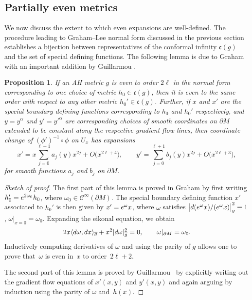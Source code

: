 \documentclass[11pt]{article}
\numberwithin{equation}{section}
\newtheorem{Proposition}[Theorem]{Proposition}
 { \theoremstyle{definition}
\newtheorem{Definition}[Theorem]{Definition}
\newtheorem{Example}[Theorem]{Example}
\newtheorem{Remark}[Theorem]{Remark} }
\newcommand{\del}{\partial}
\newcommand{\olg}{\overline{g}}
\newcommand{\frakc}{\mathfrak c}
\newcommand{\calC}{\mathcal C}
\begin{document}
\subsection{Partially even metrics}

We now discuss the extent to which even expansions are well-defined. The procedure leading to Graham--Lee normal form discussed in the previous section establishes a bijection between representatives of the conformal infinity $\mathfrak c(g)$ and the set of special defining functions. The following lemma is due to Graham \cite{Gr} with an important addition by Guillarmou \cite{Guillarmou}.

\begin{Proposition}\label{proposition1.5}
If an AH metric $g$ is even to order $2\ell$ in the normal form corresponding to one choice of metric $h_0 \in \frakc (g)$,
then it is even to the same order with respect to any other metric $h_0' \in \frakc(g)$. Further, if $x$ and $x'$ are the special boundary defining functions corresponding to $h_0$ and $h_0'$ respectively, and $y = y^{\alpha}$ and $y' = {y'}^{\alpha}$ are corresponding choices of smooth coordinates on $\partial M$ extended to be constant along the respective gradient flow lines, then coordinate change of $(\phi')^{-1}\circ \phi$ on $U_x$ has expansions
\[ x' = x \sum_{j=0}^{\ell+1} a_j(y) x^{2j} + O\big(x^{2\ell+4}\big), \qquad y' = \sum_{j=0}^{\ell+1} b_j(y) x^{2j} + O\big(x^{2\ell+3}\big), \]
for smooth functions $a_j$ and $b_j$ on $\partial M$.
\end{Proposition}
\begin{proof}[Sketch of proof] The first part of this lemma is proved in Graham \cite{Gr} by first writing $h_0' = {\rm e}^{2\omega_0} h_0$, where $\omega_0 \in \calC^\infty(\del M)$. The special boundary defining function $x'$ associated to $h_0'$ is then given by $x' = {\rm e}^{\omega} x$, where $\omega$ satisfies $\big| {\rm d}({\rm e}^\omega x)/ ({\rm e}^\omega x)\big|^2_g \equiv 1$, $\omega|_{x=0} = \omega_0$. Expanding the eikonal equation, we obtain
\begin{gather}\label{eq1.7}
2x \langle {\rm d}\omega, {\rm d}x \rangle_{\olg} + x^2 |{\rm d}\omega|^2_{\olg} = 0, \qquad \omega |_{\del M} = \omega_0.
\end{gather}
Inductively computing derivatives of $\omega$ and using the parity of $g$ allows one to prove that~$\omega$ is even in~$x$ to order~$2 \ell+2$.

The second part of this lemma is proved by Guillarmou~\cite{Guillarmou} by explicitly writing out the gradient flow equations of $x'(x,y)$ and $y'(x,y)$ and again arguing by induction using the parity of $\omega$ and~$h(x)$.
\end{proof}
\end{document}
